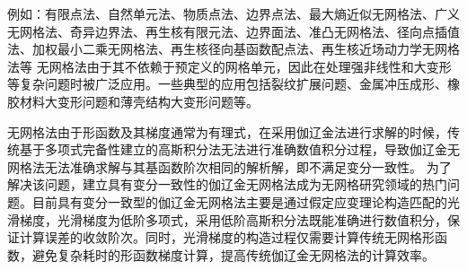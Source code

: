 例如：有限点法、自然单元法、物质点法、边界点法、最大熵近似无网格法、广义无网格法、奇异边界法、再生核有限元法、边界面法、准凸无网格法、径向点插值法、加权最小二乘无网格法、再生核径向基函数配点法、再生核近场动力学无网格法等
无网格法由于其不依赖于预定义的网格单元，因此在处理强非线性和大变形等复杂问题时被广泛应用。一些典型的应用包括裂纹扩展问题、金属冲压成形、橡胶材料大变形问题和薄壳结构大变形问题等。\par
无网格法由于形函数及其梯度通常为有理式，在采用伽辽金法进行求解的时候，传统基于多项式完备性建立的高斯积分法无法进行准确数值积分过程，导致伽辽金无网格法无法准确求解与其基函数阶次相同的解析解，即不满足变分一致性。
为了解决该问题，建立具有变分一致性的伽辽金无网格法成为无网格研究领域的热门问题。目前具有变分一致型的伽辽金无网格法主要是通过假定应变理论构造匹配的光滑梯度，光滑梯度为低阶多项式，采用低阶高斯积分法既能准确进行数值积分，保证计算误差的收敛阶次。同时，光滑梯度的构造过程仅需要计算传统无网格形函数，避免复杂耗时的形函数梯度计算，提高传统伽辽金无网格法的计算效率。 
